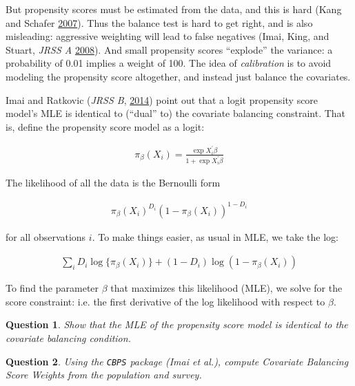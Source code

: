\documentclass[10pt, letterpaper]{article}
\theoremstyle{mytheoremstyle}
\newtheorem{question}{Question}[section]
\begin{document}
But propensity scores must be estimated from the data, and this is hard (Kang and Schafer \href{https://doi.org/10.1214/07-STS227
}{2007}). Thus the balance test is hard to get right, and is also misleading: aggressive weighting will lead to false negatives (Imai, King, and Stuart, \emph{JRSS A} \href{https://imai.fas.harvard.edu/research/files/matchse.pdf}{2008}). And small propensity scores ``explode'' the variance: a probability of 0.01 implies a weight of 100. The idea of \emph{calibration} is to avoid modeling the propensity score altogether, and instead just balance the covariates.


Imai and Ratkovic (\emph{JRSS B}, \href{https://imai.fas.harvard.edu/research/files/CBPS.pdf}{2014}) point out that a logit propensity score model's  MLE is identical to (``dual'' to) the covariate balancing constraint. That is, define  the propensity score model as a logit:

\begin{align}
\pi_\beta(X_i) = \frac{\exp{X_i^\prime\beta}}{1 + \exp{X_i^\prime\beta}}
\end{align}

The likelihood of all the data is the Bernoulli form

\begin{align}
\pi_\beta(X_i)^{D_i} (1 - \pi_\beta(X_i))^{1 - D_i}
\end{align}

for all observations $i$. To make things easier, as usual in MLE, we take the log:

\begin{align}
\sum_i D_i \log\{\pi_\beta(X_i)\} +  (1 - D_i)\log(1 - \pi_\beta(X_i))
\end{align}

To find the parameter $\beta$ that maximizes this likelihood (MLE), we solve for the score constraint: i.e. the first derivative of the log likelihood with respect to $\beta$.

\begin{question}
Show that the MLE of the propensity score model is identical to the covariate balancing condition.
\end{question}
\vspace{0.8in}

\begin{question}
Using the \texttt{CBPS} package (Imai et al.), compute Covariate Balancing Score Weights from the population and survey.
\end{question}
\end{document}
